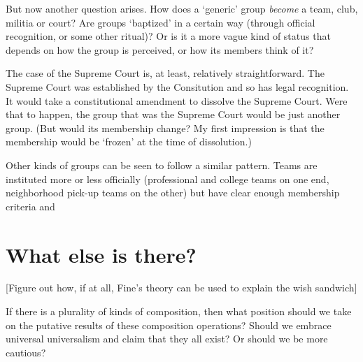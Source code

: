 \documentclass[11pt]{article}
\begin{document}
\begin{spacing}{1.25}
But now another question arises.  How does a `generic' group {\em
  become} a team, club, militia or court?  Are groups `baptized' in a
certain way (through official recognition, or some other ritual)?  Or
is it a more vague kind of status that depends on how the group is
perceived, or how its members think of it?

The case of the Supreme Court is, at least, relatively
straightforward.  The Supreme Court was established by the Consitution
and so has legal recognition.  It would take a constitutional
amendment to dissolve the Supreme Court.  Were that to happen, the
group that was the Supreme Court would be just another group.  (But
would its membership change?  My first impression is that the
membership would be `frozen' at the time of dissolution.)

Other kinds of groups can be seen to follow a similar pattern.  Teams
are instituted more or less officially (professional and college teams
on one end, neighborhood pick-up teams on the other) but have clear
enough membership criteria and 

\section{What else is there?}
[Figure out how, if at all, Fine's theory can be used to explain the
  wish sandwich]

If there is a plurality of kinds of composition, then what position
should we take on the putative results of these composition
operations?  Should we embrace universal universalism and claim that
they all exist?  Or should we be more cautious?

\begin{comment}
One is a question about the `vocality' of existence.  Are there
difference senses of `exist', or is it univocal?  ``Many
philosophers,'' says van Inwagen, ``have thought that `there is' and
`exists' mean one thing when they are applied to material objects, and
another when they are applied to, say, minds, and yet another when
they are applied to (or withheld from) supernatural beings, and one
more thing again when applied to abstractions like numbers or
possibilities'' \citeyearpar[236]{inwagen1998}.  Van Inwagen denies
this, claiming that there one sense of `exist', which is equivalent to
the quantifier $\exists$.  If van Inwagen is right about this, then,
if ``there is a chair'' is true, and if ``there is a set'' is true,
both can be expressed as ``$\exists x$\,\ldots ''


\end{comment}
\end{spacing}
\end{document}
